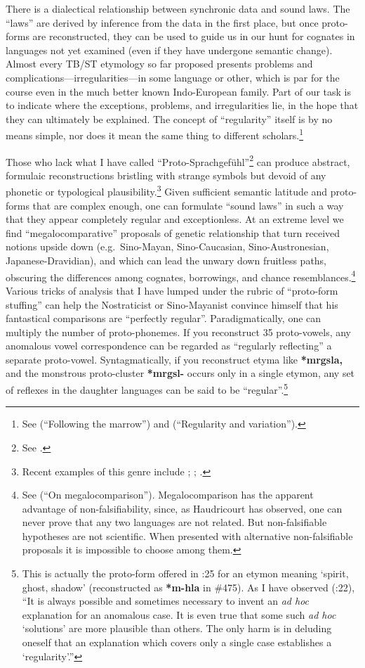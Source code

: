 There is a dialectical relationship between synchronic data and sound laws.
The “laws” are derived by inference from the data in the first place, but once
proto-forms are reconstructed, they can be used to guide us in our hunt for
cognates in languages not yet examined (even if they have undergone semantic
change). Almost every TB/ST etymology so far proposed presents problems and
complications—irregularities—in some language or other, which is par for
the course even in the much better known Indo-European family. Part of our task
is to indicate where the exceptions, problems, and irregularities lie, in the
hope that they can ultimately be explained. The concept of
“regularity” itself is by no means simple, nor does it mean the same thing to
different scholars.\footnote{See \citealt{JAM-FTM} (“Following the marrow”) and
\citeyear{JAM-RVST} (“Regularity and variation”).}


Those who lack what I have called “Proto-Sprachgefühl”\footnote{See
\citealt{JAM-PLPS}.} can produce abstract, formulaic reconstructions bristling with
strange symbols but devoid of any phonetic or typological
plausibility.\footnote{Recent examples of this genre include \citealt{KS-DGST};
\citealt{AW-CALP,AW-STLR,AW-SMS,AW-TBT}; \citealt{PS-STL}.} 
Given sufficient semantic latitude and proto-forms that are complex enough, one
can formulate “sound laws” in such a way that they appear completely regular and
exceptionless. At an extreme level we find “megalocomparative” proposals of
genetic relationship that turn received notions upside down (e.g.\ Sino-Mayan,
Sino-Caucasian, Sino-Austronesian, Japanese-Dravidian), and which can lead the
unwary down fruitless paths, obscuring the differences among cognates,
borrowings, and chance resemblances.\footnote{See \citealt{JAM-OM} (“On
megalocomparison”). Megalocomparison has the apparent advantage of
non-falsifiability, since, as Haudricourt has observed, one can never prove that
any two languages are not related. But non-falsifiable hypotheses are not
scientific. When presented with alternative non-falsifiable proposals it is
impossible to choose among them.} Various tricks of analysis that I have lumped
under the rubric of “proto-form stuffing” can help the Nostraticist or
Sino-Mayanist convince himself that his fantastical comparisons are “perfectly
regular”. Paradigmatically, one can multiply the number of proto-phonemes. If
you reconstruct 35 proto-vowels, any anomalous vowel correspondence can be
regarded as “regularly reflecting” a separate proto-vowel. Syntagmatically, if
you reconstruct etyma like \textbf{*mrgsla,} and the monstrous proto-cluster
\textbf{*mrgsl-}
occurs only in a single etymon, any set of reflexes in the daughter languages
can be said to be “regular”.\footnote{This is actually the proto-form offered
in \citealt{AW-SMS}:25 for an etymon meaning ‘spirit, ghost, shadow’ (reconstructed
as \textbf{*m-hla} in \textit{} \#475). As I have observed (\citealt{JAM-PLPS}:22), “It is always
possible and sometimes necessary to invent an \textit{ad hoc} explanation for an
anomalous case. It is even true that some such \textit{ad hoc} ‘solutions’ are more
plausible than others. The only harm is in deluding oneself that an explanation
which covers only a single case establishes a ‘regularity’.”}



